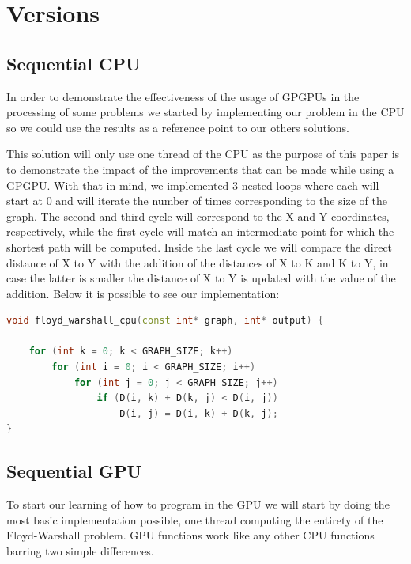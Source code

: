 \documentclass[conference]{IEEEtran}
\begin{document}
\section{Versions}
\subsection{Sequential CPU}
In order to demonstrate the effectiveness of the usage of GPGPUs in the processing 
of some problems we started by implementing our problem in the CPU so we could use the results as a reference point to our others solutions.

This solution will only use one thread of the CPU as the purpose of this paper is to demonstrate the impact of the improvements that can be made while using a GPGPU.
With that in mind, we implemented 3 nested loops where each will start at 0 and will iterate the number of times corresponding to the size of the graph.
The second and third cycle will correspond to the X and Y coordinates, respectively, 
while the first cycle will match an intermediate point for which the shortest path will be computed.
Inside the last cycle we will compare the direct distance of X to Y with the addition of the distances of X to K and K to Y, in case the latter is smaller the distance of X to Y is updated with the value of the addition.
Below it is possible to see our implementation:

\begin{lstlisting}[language=C++, caption=Sequential CPU]
void floyd_warshall_cpu(const int* graph, int* output) {
	
	for (int k = 0; k < GRAPH_SIZE; k++)
		for (int i = 0; i < GRAPH_SIZE; i++)
			for (int j = 0; j < GRAPH_SIZE; j++)
				if (D(i, k) + D(k, j) < D(i, j))
					D(i, j) = D(i, k) + D(k, j);
}
\end{lstlisting}

\subsection{Sequential GPU}
To start our learning of how to program in the GPU we will start by doing the most basic implementation possible, one thread computing the entirety of the Floyd-Warshall problem.
GPU functions work like any other CPU functions barring two simple differences. 
\end{document}
